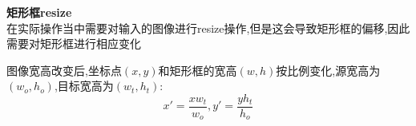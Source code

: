 
\begin{frame}
    \vspace{1em}
    \noindent\large\textbf{矩形框resize}\\
    \vspace{1em}
    在实际操作当中需要对输入的图像进行resize操作,但是这会导致矩形框的偏移,因此需要对矩形框进行相应变化\\
    \begin{figure}
        \hspace{1cm}
    \end{figure}
    图像宽高改变后,坐标点$(x,y)$和矩形框的宽高$(w,h)$按比例变化,源宽高为$(w_o,h_o)$,目标宽高为$(w_t,h_t)$:
    $$x'=\frac{xw_t}{w_o},y'=\frac{yh_t}{h_o}$$
\end{frame}

